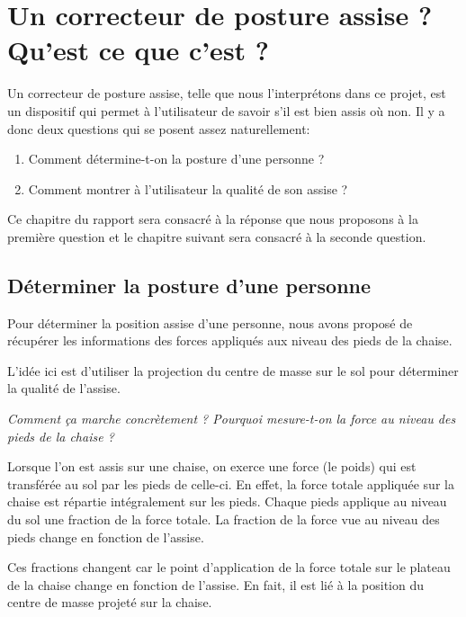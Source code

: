\documentclass{polytech/polytech}
\begin{document}
\chapter{Un correcteur de posture assise ? Qu'est ce que c'est ?}
\label{chap:correcteur posture}

Un correcteur de posture assise, telle que nous l'interprétons dans ce projet, est un dispositif qui permet à l'utilisateur de savoir s'il est bien assis où non. Il y a donc deux questions qui se posent assez naturellement:

\begin{enumerate}
\item Comment détermine-t-on la posture d'une personne ?
\item Comment montrer à l'utilisateur la qualité de son assise ?
\end{enumerate}

Ce chapitre du rapport sera consacré à la réponse que nous proposons à la première question et le chapitre suivant sera consacré à la seconde question.

\section{Déterminer la posture d'une personne}
\label{chap:posture_determination}

Pour déterminer la position assise d'une personne, nous avons proposé de récupérer les informations des forces appliqués aux niveau des pieds de la chaise. 

L'idée ici est d'utiliser la projection du centre de masse sur le sol pour déterminer la qualité de l'assise. 

\begin{center}
\textit{Comment ça marche concrètement ? Pourquoi mesure-t-on la force au niveau des pieds de la chaise ?} 
\end{center}

Lorsque l'on est assis sur une chaise, on exerce une force (le poids) qui est transférée au sol par les pieds de celle-ci. En effet, la force totale appliquée sur la chaise est répartie intégralement sur les pieds. Chaque pieds applique au niveau du sol une fraction de la force totale. La fraction de la force vue au niveau des pieds change en fonction de l'assise. 

Ces fractions changent car le point d'application de la force totale sur le plateau de la chaise change en fonction de l'assise. En fait, il est lié à la position du centre de masse projeté sur la chaise. 
\end{document}

